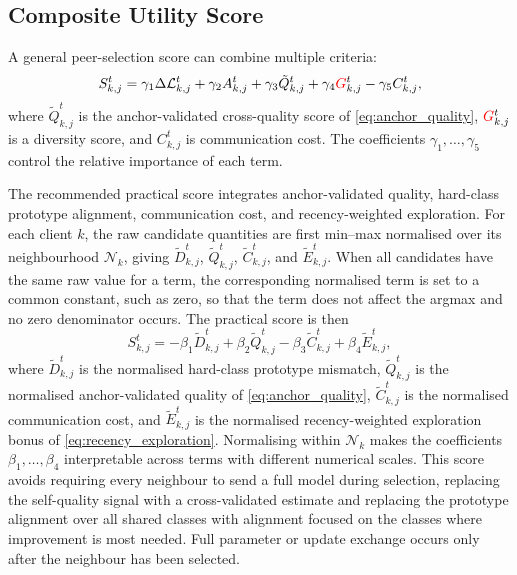 \documentclass[conference]{IEEEtran}
\newcommand{\rev}[1]{{\color{red}#1}}
\begin{document}
\subsection{Composite Utility Score}
\label{subsec:composite-utility-score}
A general peer-selection score can combine multiple criteria:
\begin{equation}
    S_{k,j}^{t}
    =
    \gamma_1 \Delta\mathcal{L}_{k,j}^{t}
    +
    \gamma_2 A_{k,j}^{t}
    +
    \gamma_3 \tilde{Q}_{k,j}^{t}
    +
    \gamma_4 \rev{G}_{k,j}^{t}
    -
    \gamma_5 C_{k,j}^{t},
    \label{eq:composite_score}
\end{equation}
where \(\tilde{Q}_{k,j}^t\) is the anchor-validated cross-quality score of \eqref{eq:anchor_quality}, \(\rev{G}_{k,j}^t\) is a diversity score, and \(C_{k,j}^t\) is communication cost. The coefficients \(\gamma_1,\dots,\gamma_5\) control the relative importance of each term.

The recommended practical score integrates anchor-validated quality, hard-class prototype alignment, communication cost, and recency-weighted exploration. For each client \(k\), the raw candidate quantities are first min--max normalised over its neighbourhood \(\mathcal{N}_k\), giving \(\widetilde{D}_{k,j}^t\), \(\widetilde{Q}_{k,j}^t\), \(\widetilde{C}_{k,j}^t\), and \(\widetilde{E}_{k,j}^t\). \rev{When all candidates have the same raw value for a term, the corresponding normalised term is set to a common constant, such as zero, so that the term does not affect the argmax and no zero denominator occurs.} The practical score is then
\begin{equation}
    S_{k,j}^{t}
    =
    -\beta_1 \widetilde{D}_{k,j}^{t}
    +
    \beta_2 \widetilde{Q}_{k,j}^t
    -
    \beta_3 \widetilde{C}_{k,j}^t
    +
    \beta_4 \widetilde{E}_{k,j}^t,
    \label{eq:recommended_score}
\end{equation}
where \(\widetilde{D}_{k,j}^{t}\) is the normalised hard-class prototype mismatch, \(\widetilde{Q}_{k,j}^t\) is the normalised anchor-validated quality of \eqref{eq:anchor_quality}, \(\widetilde{C}_{k,j}^t\) is the normalised communication cost, and \(\widetilde{E}_{k,j}^t\) is the normalised recency-weighted exploration bonus of \eqref{eq:recency_exploration}. Normalising within \(\mathcal{N}_k\) makes the coefficients \(\beta_1,\ldots,\beta_4\) interpretable across terms with different numerical scales. This score avoids requiring every neighbour to send a full model during selection, replacing the self-quality signal with a cross-validated estimate and replacing the prototype alignment over all shared classes with alignment focused on the classes where improvement is most needed. Full parameter or update exchange occurs only after the neighbour has been selected.
\end{document}
